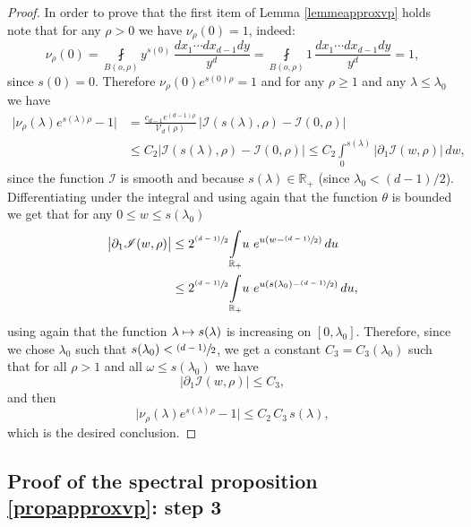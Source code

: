 \documentclass[JEP,XML,SOM,Unicode,NoFloatCountersInSection,published]{cedram}
\let\mathcal\mathscr
\newcommand{\psfrac}[2]{\sfrac{(#1)}{#2}}
\def\mto{\mathchoice{\longmapsto}{\mapsto}{\mapsto}{\mapsto}}
\theoremstyle{plain}
\theoremstyle{definition}
\newcommand{\RR}{\mathbb{R}}
\newcommand{\inte}[1]{\underset{#1}{\int}}
\newcommand{\finte}[3]{\underset{#1}{\fint} {#2} \, {#3}}
\begin{document}
\begin{proof}
In order to prove that the first item of Lemma \ref{lemmeapproxvp} holds note that for any $\rho > 0$ we have $ \nu_{\rho}(0) = 1$, indeed:
\[
\nu_{\rho}(0) = \finte{B(o, \rho)}{ y^{s(0)}}{ \frac{dx_1\cdots dx_{d-1} dy}{y^d}} = \finte{B(o, \rho)}{1}{ \frac{dx_1\cdots dx_{d-1} dy}{y^d}} = 1,
\]
since $s(0) = 0$. Therefore $\nu_{\rho}(0) e^{s(0) \rho} = 1$ and for any $\rho \ge 1$ and any $\lambda \le \lambda_0$ we have
\begin{align*}
\bigl| \nu_{\rho}(\lambda) e^{s(\lambda) \rho} - 1 \bigr| & = \frac{ c_{d-1} e^{(d-1)\rho}} {\mathcal{V}_d(\rho)} \, \bigl| \mathcal{I}(s(\lambda),\rho) - \mathcal{I}(0,\rho) \bigr| \\
& \le C_2 \bigl| \mathcal{I}(s(\lambda),\rho) - \mathcal{I}(0,\rho) \bigr|  \le C_2 \inte{0}^{s(\lambda)} \bigl| \partial_1 \mathcal{I}(w,\rho) \bigr| \,dw,
\end{align*}
since the function $\mathcal{I}$ is smooth and because $s(\lambda) \in \RR_+$ (since $\lambda_0 < (d-1)/2$). Differentiating under the integral and using again that the function $\theta$ is bounded we get that for any $ 0 \le w \le s(\lambda_0)$
\begin{align*}
\bigl| \partial_1 \mathcal{I}(w,\rho) \bigr| & \le 2^{ \psfrac{d-1}{2}} \inte{\RR_+} u \ e^{ u \left(w -\psfrac{d-1}{2} \right) } \,du \\
& \le 2^{ \psfrac{d-1}{2}} \inte{\RR_+} u \ e^{ u \left(s(\lambda_0) -\psfrac{d-1}{2} \right) } \,du,
\end{align*}
using again that the function $\lambda \mto s(\lambda)$ is increasing on $[0, \lambda_0]$. Therefore, since we chose $\lambda_0$ such that $s(\lambda_0) < \psfrac{d-1}{2}$, we get a constant $C_3 = C_3(\lambda_0)$ such that for all $\rho > 1$ and all $\omega \le s(\lambda_0)$ we have
\[
\bigl| \partial_1 \mathcal{I}(w,\rho) \bigr| \le C_3,
\]
and then
\[
\bigl| \nu_{\rho}(\lambda) e^{s(\lambda) \rho} - 1 \bigr| \le C_2 \, C_3 \, s(\lambda),
\]
which is the desired conclusion.
\end{proof}

\subsection{Proof of the spectral proposition \ref{propapproxvp}: step 3}
\end{document}
